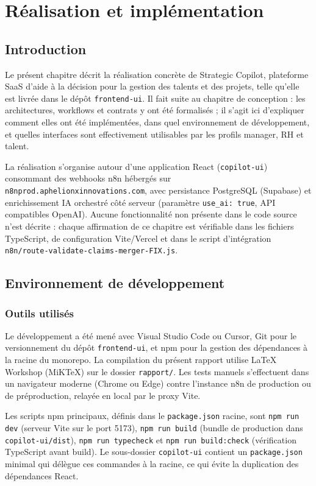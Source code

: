 \chapter{Réalisation et implémentation}

\section{Introduction}

Le présent chapitre décrit la réalisation concrète de Strategic Copilot, plateforme SaaS d'aide à la décision pour la gestion des talents et des projets, telle qu'elle est livrée dans le dépôt \texttt{frontend-ui}. Il fait suite au chapitre de conception : les architectures, workflows et contrats y ont été formalisés ; il s'agit ici d'expliquer comment elles ont été implémentées, dans quel environnement de développement, et quelles interfaces sont effectivement utilisables par les profils manager, RH et talent.

La réalisation s'organise autour d'une application React (\texttt{copilot-ui}) consommant des webhooks n8n hébergés sur \texttt{n8nprod.aphelionxinnovations.com}, avec persistance PostgreSQL (Supabase) et enrichissement IA orchestré côté serveur (paramètre \texttt{use\_ai: true}, API compatibles OpenAI). Aucune fonctionnalité non présente dans le code source n'est décrite : chaque affirmation de ce chapitre est vérifiable dans les fichiers TypeScript, de configuration Vite/Vercel et dans le script d'intégration \texttt{n8n/route-validate-claims-merger-FIX.js}.

\section{Environnement de développement}

\subsection{Outils utilisés}

Le développement a été mené avec Visual Studio Code ou Cursor, Git pour le versionnement du dépôt \texttt{frontend-ui}, et npm pour la gestion des dépendances à la racine du monorepo. La compilation du présent rapport utilise LaTeX Workshop (MiKTeX) sur le dossier \texttt{rapport/}. Les tests manuels s'effectuent dans un navigateur moderne (Chrome ou Edge) contre l'instance n8n de production ou de préproduction, relayée en local par le proxy Vite.

Les scripts npm principaux, définis dans le \texttt{package.json} racine, sont \texttt{npm run dev} (serveur Vite sur le port 5173), \texttt{npm run build} (bundle de production dans \texttt{copilot-ui/dist}), \texttt{npm run typecheck} et \texttt{npm run build:check} (vérification TypeScript avant build). Le sous-dossier \texttt{copilot-ui} contient un \texttt{package.json} minimal qui délègue ces commandes à la racine, ce qui évite la duplication des dépendances React.

